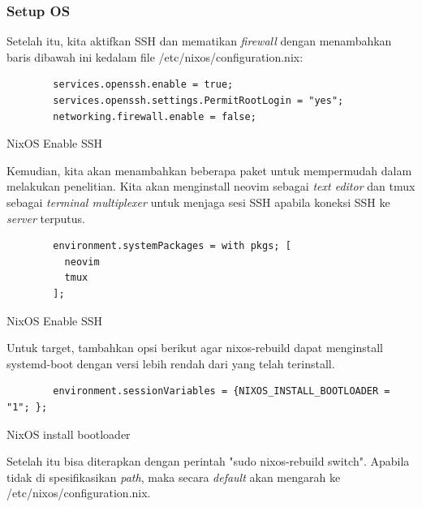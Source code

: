 \documentclass[10pt,]{report}
\newenvironment{code}{\captionsetup{type=listing}}{\vspace{3mm}}
\begin{document}
\begin{adjustwidth}{20pt}{}
	\subsubsection{Setup OS}
	\begin{adjustwidth}{20pt}{}
		Setelah itu, kita aktifkan SSH dan mematikan \textit{firewall} dengan
		menambahkan baris dibawah ini kedalam file /etc/nixos/configuration.nix:
		\begin{code}
			\begin{verbatim}
        services.openssh.enable = true;
        services.openssh.settings.PermitRootLogin = "yes";
        networking.firewall.enable = false;
      \end{verbatim}
			\caption{NixOS Enable SSH}
		\end{code}

		Kemudian, kita akan menambahkan beberapa paket untuk mempermudah dalam
		melakukan penelitian. Kita akan menginstall neovim sebagai \textit{text editor}
		dan tmux sebagai \textit{terminal multiplexer} untuk menjaga sesi SSH apabila koneksi
		SSH ke \textit{server} terputus.

		\begin{code}
			\begin{verbatim}
        environment.systemPackages = with pkgs; [
          neovim
          tmux
        ];
      \end{verbatim}
			\caption{NixOS Enable SSH}
		\end{code}

		Untuk target, tambahkan opsi berikut agar nixos-rebuild dapat menginstall
		systemd-boot dengan versi lebih rendah dari yang telah terinstall.
		\begin{code}
			\begin{verbatim}
        environment.sessionVariables = {NIXOS_INSTALL_BOOTLOADER = "1"; };
      \end{verbatim}
			\caption{NixOS install bootloader}
		\end{code}
		Setelah itu bisa diterapkan dengan perintah "sudo nixos-rebuild switch".
		Apabila tidak di spesifikasikan \textit{path}, maka secara \textit{default}
		akan mengarah ke /etc/nixos/configuration.nix.
	\end{adjustwidth}


\end{adjustwidth}
\end{document}
